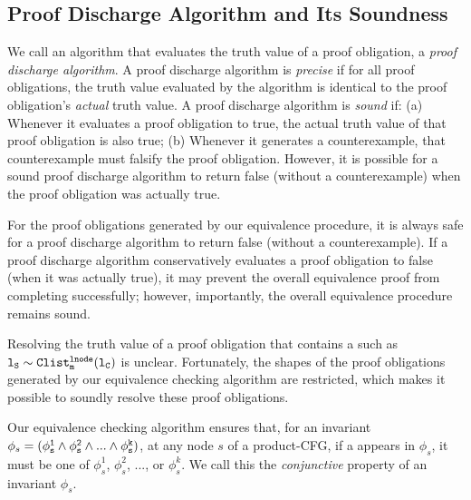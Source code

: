 \subsection{Proof Discharge Algorithm and Its Soundness}
\label{sec:proofDischarge}
We call an algorithm that evaluates the
truth value of a proof obligation, a {\em proof discharge algorithm}.
A proof discharge algorithm is {\em precise} if for all
proof obligations, the
truth value evaluated by the algorithm is identical to the
proof obligation's
{\em actual} truth value.
A proof discharge algorithm is {\em sound} if:
(a) Whenever it evaluates a proof obligation to true, the
actual truth value of that proof obligation is also true;
(b) Whenever it generates a counterexample, that counterexample
must falsify the proof obligation.
However, it is possible for a sound proof discharge
algorithm to return false (without a counterexample)
when the proof obligation was actually true.

For
the proof obligations generated by our equivalence
procedure,
it is always safe for a proof discharge algorithm to
return false (without a counterexample).
If a proof
discharge algorithm conservatively
evaluates a proof obligation to false (when it
was actually true), it may
prevent the overall equivalence proof from completing successfully;
however, importantly, the overall equivalence procedure remains sound.

Resolving the truth value of a proof obligation that contains
a \recursiveRelation{} such as ${\tt l_{S}\sim{}Clist^{{\tt lnode}}_{m}(l_{C})}$ is unclear.
Fortunately, the shapes of the proof obligations generated
by our equivalence checking algorithm are restricted, which
makes it possible to soundly resolve these proof obligations.

Our equivalence
checking algorithm ensures that, for an invariant
$\phi_s=({\tt \phi^{1}_s \land \phi^{2}_s \land ... \land \phi^{k}_s})$,
at any node $s$
of a product-CFG,
if a \recursiveRelation{} appears in $\phi_s$, it
must be one of $\phi^{1}_s$, $\phi^{2}_s$, ..., or $\phi^{k}_s$. We call
this the {\em conjunctive \recursiveRelation{}} property of an invariant $\phi_s$.

